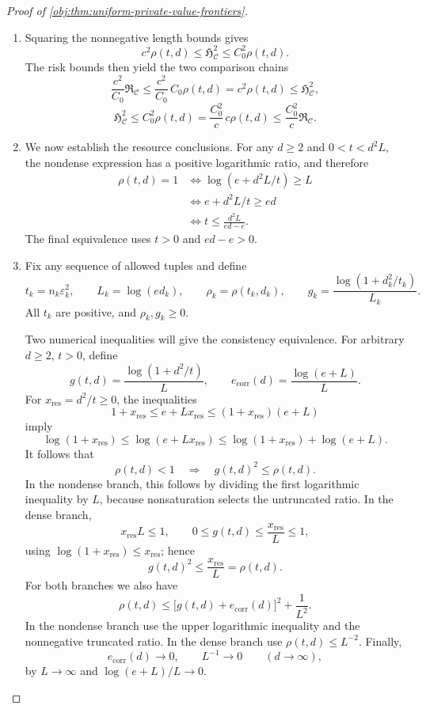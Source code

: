 \documentclass[11pt]{article}
\begin{document}
\begin{proof}[Proof of \cref{obj:thm:uniform-private-value-frontiers}]
\begin{enumerate}
\item
Squaring the nonnegative length bounds gives
\[
c^2\rho(t,d)\le\mathfrak H_{\mathcal C}^2
\le C_0^2\rho(t,d).
\]
The risk bounds then yield the two comparison chains
\[
\frac{c^2}{C_0}\mathfrak R_{\mathcal C}
\le\frac{c^2}{C_0}\,C_0\rho(t,d)
=c^2\rho(t,d)
\le\mathfrak H_{\mathcal C}^2,
\]
\[
\mathfrak H_{\mathcal C}^2
\le C_0^2\rho(t,d)
=\frac{C_0^2}{c}\,c\rho(t,d)
\le\frac{C_0^2}{c}\mathfrak R_{\mathcal C}.
\]

\item
We now establish the resource conclusions. For any \(d\ge2\) and
\(0<t<d^2L\), the nondense expression has a positive logarithmic ratio, and therefore
\[
\begin{aligned}
\rho(t,d)=1
&\iff \log(e+d^2L/t)\ge L\\
&\iff e+d^2L/t\ge ed\\
&\iff t\le\frac{d^2L}{ed-e}.
\end{aligned}
\]
The final equivalence uses \(t>0\) and \(ed-e>0\).

\item
Fix any sequence of allowed tuples and define
\[
t_k=n_k\varepsilon_k^2,\qquad
L_k=\log(ed_k),\qquad
\rho_k=\rho(t_k,d_k),\qquad
g_k=\frac{\log(1+d_k^2/t_k)}{L_k}.
\]
All \(t_k\) are positive, and \(\rho_k,g_k\ge0\).

Two numerical inequalities will give the consistency equivalence. For arbitrary \(d\ge2\), \(t>0\), define
\[
g(t,d)=\frac{\log(1+d^2/t)}{L},
\qquad
e_{\mathrm{corr}}(d)=\frac{\log(e+L)}{L}.
\]
For \(x_{\mathrm{res}}=d^2/t\ge0\), the inequalities
\[
1+x_{\mathrm{res}}\le e+Lx_{\mathrm{res}}
\le(1+x_{\mathrm{res}})(e+L)
\]
imply
\[
\log(1+x_{\mathrm{res}})
\le\log(e+Lx_{\mathrm{res}})
\le\log(1+x_{\mathrm{res}})+\log(e+L).
\]
It follows that
\[
\rho(t,d)<1\quad\Longrightarrow\quad
g(t,d)^2\le\rho(t,d).
\]
In the nondense branch, this follows by dividing the first logarithmic inequality by \(L\), because nonsaturation selects the untruncated ratio. In the dense branch,
\[
x_{\mathrm{res}}L\le1,\qquad
0\le g(t,d)\le\frac{x_{\mathrm{res}}}{L}\le1,
\]
using \(\log(1+x_{\mathrm{res}})\le x_{\mathrm{res}}\); hence
\[
g(t,d)^2\le\frac{x_{\mathrm{res}}}{L}=\rho(t,d).
\]
For both branches we also have
\[
\rho(t,d)
\le\bigl[g(t,d)+e_{\mathrm{corr}}(d)\bigr]^2+\frac1{L^2}.
\]
In the nondense branch use the upper logarithmic inequality and the nonnegative truncated ratio. In the dense branch use
\(\rho(t,d)\le L^{-2}\).
Finally,
\[
e_{\mathrm{corr}}(d)\longrightarrow0,
\qquad
L^{-1}\longrightarrow0
\qquad(d\longrightarrow\infty),
\]
by \(L\to\infty\) and \(\log(e+L)/L\to0\).


\end{enumerate}
\end{proof}
\end{document}
